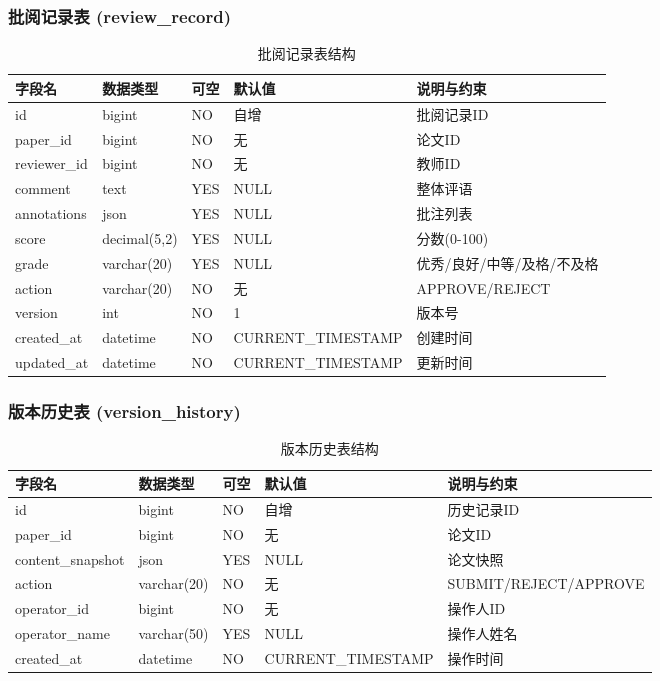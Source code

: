 \documentclass{../template/softeng}
\begin{document}
	\subsubsection{批阅记录表 (review\_record)}
	\begin{table}[htbp]
		\centering
		\begin{tabular}{|l|l|l|l|l|}
			\hline
			\textbf{字段名} & \textbf{数据类型} & \textbf{可空} & \textbf{默认值} & \textbf{说明与约束} \\
			\hline
			id & bigint & NO & 自增 & 批阅记录ID \\
			paper\_id & bigint & NO & 无 & 论文ID \\
			reviewer\_id & bigint & NO & 无 & 教师ID \\
			comment & text & YES & NULL & 整体评语 \\
			annotations & json & YES & NULL & 批注列表 \\
			score & decimal(5,2) & YES & NULL & 分数(0-100) \\
			grade & varchar(20) & YES & NULL & 优秀/良好/中等/及格/不及格 \\
			action & varchar(20) & NO & 无 & APPROVE/REJECT \\
			version & int & NO & 1 & 版本号 \\
			created\_at & datetime & NO & CURRENT\_TIMESTAMP & 创建时间 \\
			updated\_at & datetime & NO & CURRENT\_TIMESTAMP & 更新时间 \\
			\hline
		\end{tabular}
		\caption{批阅记录表结构}
	\end{table}

	\subsubsection{版本历史表 (version\_history)}
	\begin{table}[htbp]
		\centering
		\begin{tabular}{|l|l|l|l|l|}
			\hline
			\textbf{字段名} & \textbf{数据类型} & \textbf{可空} & \textbf{默认值} & \textbf{说明与约束} \\
			\hline
			id & bigint & NO & 自增 & 历史记录ID \\
			paper\_id & bigint & NO & 无 & 论文ID \\
			content\_snapshot & json & YES & NULL & 论文快照 \\
			action & varchar(20) & NO & 无 & SUBMIT/REJECT/APPROVE \\
			operator\_id & bigint & NO & 无 & 操作人ID \\
			operator\_name & varchar(50) & YES & NULL & 操作人姓名 \\
			created\_at & datetime & NO & CURRENT\_TIMESTAMP & 操作时间 \\
			\hline
		\end{tabular}
		\caption{版本历史表结构}
	\end{table}
\end{document}
